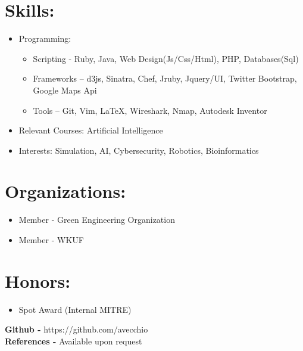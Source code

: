\documentclass{res}
\begin{document}
\section{Skills:}
\begin{itemize}
\item Programming:
\begin{itemize}[label=$\circ$]
\item Scripting - Ruby, Java, Web Design(Js/Css/Html), PHP, Databases(Sql)%
\item Frameworks – d3js, Sinatra, Chef, Jruby, Jquery/UI, Twitter Bootstrap, Google Maps Api%
\item Tools – Git, Vim, \LaTeX, Wireshark, Nmap, Autodesk Inventor
\end{itemize}
\item Relevant Courses: Artificial Intelligence
\item Interests: Simulation, AI, Cybersecurity, Robotics, Bioinformatics
\end{itemize}
\section{Organizations:}
\begin{itemize}
\item Member - Green Engineering Organization
\item Member - WKUF
\end{itemize}

\section{Honors:}
\begin{itemize}
\item Spot Award (Internal MITRE)
\end{itemize}

\begin{center}
\textbf{Github - }https://github.com/avecchio\\
\textbf{References - }Available upon request
\end{center}
\end{document}
